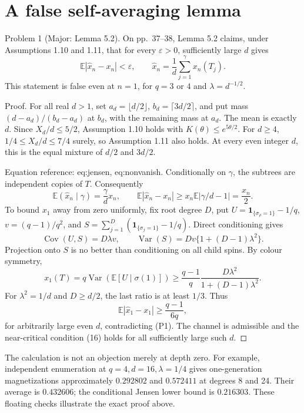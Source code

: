 \documentclass[10pt]{article}
\begin{document}
\section*{A false self-averaging lemma}
Problem 1 (Major: Lemma 5.2).  On pp. 37–38, Lemma 5.2 claims, under Assumptions 1.10 and 1.11, that for every \(\varepsilon>0\), sufficiently large \(d\) gives \[\mathbb E\left|\widehat x_n-x_n\right|<\varepsilon,\qquad
 \widehat x_n=\frac1d\sum_{j=1}^{\gamma}x_n(T_j).
 \tag{P1}\] This statement is false even at \(n=1\), for \(q=3\) or \(4\) and \(\lambda=d^{-1/2}\).\par
Proof. For all real \(d>1\), set \(a_d=\lfloor d/2\rfloor\), \(b_d=\lceil3d/2\rceil\), and put mass \((d-a_d)/(b_d-a_d)\) at \(b_d\), with the remaining mass at \(a_d\). The mean is exactly \(d\). Since \(X_d/d\leq5/2\), Assumption 1.10 holds with \(K(\theta)\leq e^{5\theta/2}\). For \(d\geq4\), \(1/4\leq X_d/d\leq7/4\) surely, so Assumption 1.11 also holds. At every even integer \(d\), this is the equal mixture of \(d/2\) and \(3d/2\).\par
Equation reference: eq:jensen, eq:nonvanish. Conditionally on \(\gamma\), the subtrees are independent copies of \(T\). Consequently \[\mathbb E(\widehat x_n\mid\gamma)=\frac{\gamma}{d}x_n,\qquad
 \mathbb E|\widehat x_n-x_n|
 \geq x_n\mathbb E|\gamma/d-1|=\frac{x_n}{2}.
 \] To bound \(x_1\) away from zero uniformly, fix root degree \(D\), put \(U=\mathbf1_{\{\sigma_\rho=1\}}-1/q\), \(v=(q-1)/q^2\), and \(S=\sum_{j=1}^D(\mathbf1_{\{\sigma_j=1\}}-1/q)\). Direct conditioning gives \[\operatorname{Cov}(U,S)=D\lambda v,\qquad
 \operatorname{Var}(S)=Dv\{1+(D-1)\lambda^2\}.\] Projection onto \(S\) is no better than conditioning on all child spins. By colour symmetry, \[x_1(T)=q\operatorname{Var}(\mathbb E[U\mid\sigma(1)])
 \geq \frac{q-1}{q}\frac{D\lambda^2}{1+(D-1)\lambda^2}.\] For \(\lambda^2=1/d\) and \(D\geq d/2\), the last ratio is at least \(1/3\). Thus \[\mathbb E|\widehat x_1-x_1|\geq\frac{q-1}{6q},
 \] for arbitrarily large even \(d\), contradicting (P1). The channel is admissible and the near-critical condition (16) holds for all sufficiently large such \(d\). ◻\par
The calculation is not an objection merely at depth zero. For example, independent enumeration at \(q=4,d=16,\lambda=1/4\) gives one-generation magnetizations approximately \(0.292802\) and \(0.572411\) at degrees 8 and 24. Their average is \(0.432606\); the conditional Jensen lower bound is \(0.216303\). These floating checks illustrate the exact proof above.\par
\end{document}
